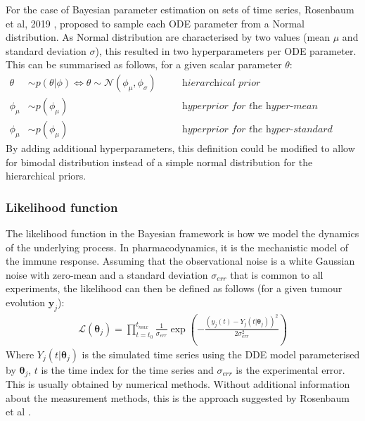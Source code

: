 \documentclass[11pt]{article}
\begin{document}
For the case of Bayesian parameter estimation on sets of time series, Rosenbaum et al, 2019 \cite{rosenbaum}, proposed to sample each ODE parameter from a Normal distribution. As Normal distribution are characterised by two values (mean $\mu$ and standard deviation $\sigma$), this resulted in two hyperparameters per ODE parameter. This can be summarised as follows, for a given scalar parameter $\theta$:
\begin{align*}
    \theta &\sim p(\theta | \phi) \Leftrightarrow \theta \sim \mathcal{N}(\phi_\mu, \phi_\sigma) \quad &&\textit{hierarchical prior} \\ 
    \phi_\mu &\sim p(\phi_\mu) \quad &&\textit{hyperprior for the hyper-mean} \\ 
    \phi_\mu &\sim p(\phi_\mu) \quad &&\textit{hyperprior for the hyper-standard deviation} 
\end{align*}
By adding additional hyperparameters, this definition could be modified to allow for bimodal distribution instead of a simple normal distribution for the hierarchical priors.

\subsubsection{Likelihood function}
The likelihood function in the Bayesian framework is how we model the dynamics of the underlying process. In pharmacodynamics, it is the mechanistic model of the immune response. Assuming that the observational noise is a white Gaussian noise with zero-mean and a standard deviation $\sigma_{err}$ that is common to all experiments, the likelihood can then be defined as follows \cite{liu_wang}\cite{likelihood_2} (for a given tumour evolution $\boldsymbol{y}_j$):
\begin{align*}
    \mathcal{L}(\boldsymbol{\theta}_j) = \prod_{t=t_0}^{t_{max}} \frac{1}{\sigma_{err}} \exp\left(-\frac{(y_{j}(t) - Y_j(t|\boldsymbol{\theta}_j))^2}{2\sigma_{err}^2}\right)  
\end{align*}
Where $Y_j(t|\boldsymbol{\theta}_j)$ is the simulated time series using the DDE model parameterised by $\boldsymbol{\theta}_j$, $t$ is the time index for the time series and $\sigma_{err}$ is the experimental error. This is usually obtained by numerical methods. Without additional information about the measurement methods, this is the approach suggested by Rosenbaum et al \cite{rosenbaum}.

\end{document}
